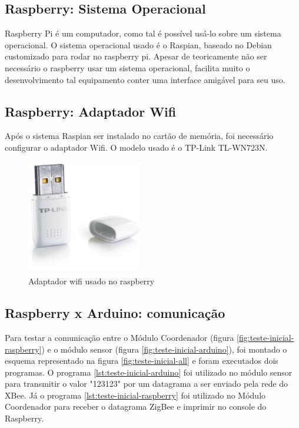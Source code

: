 \subsection{Raspberry: Sistema Operacional}

Raspberry Pi é um computador, como tal é possível usá-lo sobre um sistema operacional. O sistema operacional usado é o Raspian, baseado no Debian customizado para rodar no raspberry pi. Apesar de teoricamente não ser necessário o raspberry usar um sistema operacional, facilita muito o desenvolvimento tal equipamento conter uma interface amigável para seu uso.

\subsection{Raspberry: Adaptador Wifi}

Após o sistema Raspian ser instalado no cartão de memória, foi necessário configurar o adaptador Wifi. O modelo usado é o TP-Link TL-WN723N.

\begin{figure}[H]
\centering
\includegraphics[width=5cm,height=5cm,keepaspectratio]{figuras/wifi-adapter.jpg}
\caption{\label{fig:wifi-adapter} Adaptador wifi usado no raspberry}
\end{figure}

\subsection{Raspberry x Arduino: comunicação}

Para testar a comunicação entre o Módulo Coordenador (figura \ref{fig:teste-inicial-raspberry}) e o módulo sensor (figura \ref{fig:teste-inicial-arduino}), foi montado o esquema representado na figura \ref{fig:teste-inicial-all} e foram executados dois programas. O programa \ref{lst:teste-inicial-arduino} foi utilizado no módulo sensor para transmitir o valor "123123" por um datagrama a ser enviado pela rede do XBee. Já o programa \ref{lst:teste-inicial-raspberry} foi utilizado no Módulo Coordenador para receber o datagrama ZigBee e imprimir no console do Raspberry.

